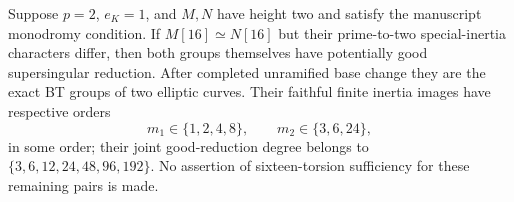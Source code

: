 \begin{proposition}
\label{prop:B-RD44}
Suppose $p=2$, $e_K=1$, and $M,N$ have height two and satisfy
the manuscript monodromy condition. If
$M[16]\simeq N[16]$ but their prime-to-two special-inertia
characters differ, then both groups themselves have potentially
good supersingular reduction. After completed unramified base
change they are the exact BT groups of two elliptic curves.
Their faithful finite inertia images have respective orders
\[
       m_1\in\{1,2,4,8\},\qquad m_2\in\{3,6,24\},
 \tag{B-RD44.4}
\]
in some order; their joint good-reduction degree belongs to
$\{3,6,12,24,48,96,192\}$.
No assertion of sixteen-torsion sufficiency for these remaining
pairs is made.
\end{proposition}

